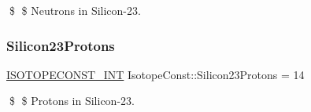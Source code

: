 \$ \$ Neutrons in Silicon-\/23. \mbox{\label{group___isotope_const-_silicon-_si23_gaffadb4fe268526d1d59450e08e28ee2a}} 
\subsubsection{\texorpdfstring{Silicon23\+Protons}{Silicon23Protons}}
{\footnotesize\ttfamily \mbox{\hyperlink{group___isotope_const-_macros_ga5f18360b3e99483a35c32d789e62621c}{I\+S\+O\+T\+O\+P\+E\+C\+O\+N\+S\+T\+\_\+\+I\+NT}} Isotope\+Const\+::\+Silicon23\+Protons = 14}

\$ \$ Protons in Silicon-\/23. 